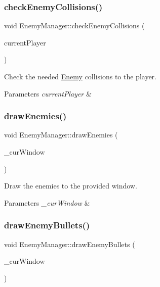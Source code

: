 \subsubsection{\texorpdfstring{check\+Enemy\+Collisions()}{checkEnemyCollisions()}}
{\footnotesize\ttfamily void Enemy\+Manager\+::check\+Enemy\+Collisions (\begin{DoxyParamCaption}\item[{\hyperlink{class_player}{Player} \&}]{current\+Player }\end{DoxyParamCaption})}



Check the needed \hyperlink{class_enemy}{Enemy} collisions to the player. 


\begin{DoxyParams}{Parameters}
{\em current\+Player} & \\
\hline
\end{DoxyParams}
\mbox{\label{class_enemy_manager_af740dd63780a06fde9a5dd72330624da}} 
\subsubsection{\texorpdfstring{draw\+Enemies()}{drawEnemies()}}
{\footnotesize\ttfamily void Enemy\+Manager\+::draw\+Enemies (\begin{DoxyParamCaption}\item[{sf\+::\+Render\+Window $\ast$}]{\+\_\+cur\+Window }\end{DoxyParamCaption})}



Draw the enemies to the provided window. 


\begin{DoxyParams}{Parameters}
{\em \+\_\+cur\+Window} & \\
\hline
\end{DoxyParams}
\mbox{\label{class_enemy_manager_ae551aa23d45b17e6c9b3d5b12e39ab26}} 
\subsubsection{\texorpdfstring{draw\+Enemy\+Bullets()}{drawEnemyBullets()}}
{\footnotesize\ttfamily void Enemy\+Manager\+::draw\+Enemy\+Bullets (\begin{DoxyParamCaption}\item[{sf\+::\+Render\+Window $\ast$}]{\+\_\+cur\+Window }\end{DoxyParamCaption})}



